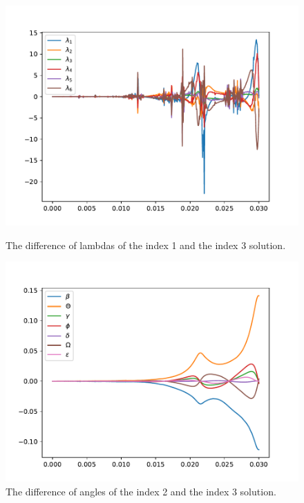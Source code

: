 \documentclass{report}
\begin{document}
\begin{figure}[h]
\centering
\begin{minipage}[t]{0.45\textwidth}
\centering
\includegraphics[width=\textwidth]{../Plots/Project2_main/Figure_532}
\caption{The difference of lambdas of the index 1 and the index 3 solution.}
\label{pl:indx1_solndiff_lambdas}
\end{minipage}
\hfill
\begin{minipage}[t]{0.45\textwidth}
\centering
\includegraphics[width=\textwidth]{../Plots/Project2_main/Figure_540}
\caption{The difference of angles of the index 2 and the index 3 solution.}
\label{pl:indx2_solndiff_angles}
\end{minipage}
\end{figure}
\end{document}
